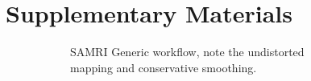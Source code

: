 \renewcommand{\thetable}{S\arabic{table}}
\setcounter{figure}{0}
\renewcommand{\thefigure}{S\arabic{figure}}

\section{Supplementary Materials}

\begin{figure}[h!]
	\centering
	\begin{subfigure}[t]{0.48\textwidth}
		\centering
		\setlength{\fboxsep}{0pt}%
		\setlength{\fboxrule}{0.2pt}%
		\caption{
			SAMRI Generic workflow, note the undistorted mapping and conservative smoothing.
			\vspace{1em}
			}
		\label{fig:fit_gg}
	\end{subfigure}\hfill
	\begin{subfigure}[t]{0.48\textwidth}
		\centering
		\setlength{\fboxsep}{0pt}%
		\setlength{\fboxrule}{0.2pt}%
		\fbox{
}
\end{subfigure}
\end{figure}
